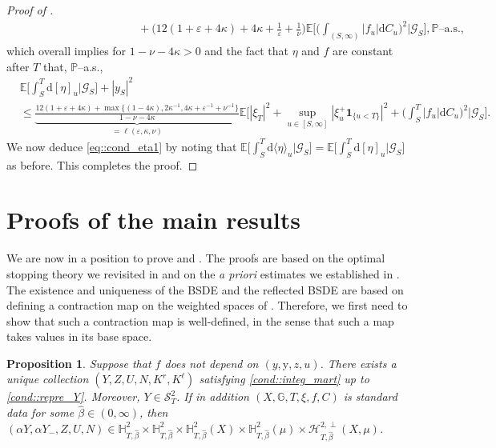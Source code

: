 \documentclass[10pt]{article} %
\newtheorem{proposition}[theorem]{Proposition}
\newcommand\cG{\mathcal G}
\newcommand\cH{\mathcal H}
\newcommand\cS{\mathcal S}
\def \E{\mathbb{E}}
\def \G{\mathbb{G}}
\def \H{\mathbb{H}}
\def \P{\mathbb{P}}
\def\Gc{\mathcal{G}}
\def\eps{\varepsilon}
\def\d{\mathrm{d}}
\begin{document}
\begin{proof}[Proof of ]
\begin{align*}
    &\hspace{4cm}\quad + \bigg(12(1+\varepsilon+4\kappa) + 4\kappa + \frac{1}{\varepsilon} + \frac{1}{\nu}\bigg)\E\bigg[\bigg(\int_{(S,\infty)} | f_u| \d C_u\bigg)^2\bigg|\Gc_S\bigg], \text{$\P$--a.s.},
\end{align*}
which overall implies for $1-\nu-4\kappa > 0$ and the fact that $\eta$ and $f$ are constant after $T$ that, $\P$--a.s.,
\begin{align*}
 &\E\bigg[ \int_S^T \d[\eta]_u \bigg| \cG_S \bigg] + |y_S|^2 \\
 &\leq \underbrace{\frac{12(1+\varepsilon+4\kappa) + \max\{(1-4\kappa),2\kappa^{-1},4\kappa+\varepsilon^{-1}+\nu^{-1}\}}{1-\nu-4\kappa}}_{=\ell(\eps,\kappa,\nu)}\E\bigg[ |\xi_T|^2 + \sup_{u \in [S,\infty]} |\xi^+_u\mathbf{1}_{\{u<T\}}|^2 +\bigg(\int_S^T | f_u| \d C_u\bigg)^2\bigg|\Gc_S \bigg].
\end{align*}
We now deduce \eqref{eq::cond_eta1} by noting that $\E\big[ \int_S^T \d\langle\eta\rangle_u \big| \cG_S \big] =  \E\big[ \int_S^T \d[\eta]_u \big| \cG_S \big]$ as before. This completes the proof.
\end{proof}




\section{Proofs of the main results}\label{sec::existence_rbsde}

We are now in a position to prove  and . The proofs are based on the optimal stopping theory we revisited in  and on the \emph{a priori} estimates we established in . The existence and uniqueness of the BSDE and the reflected BSDE are based on defining a contraction map on the weighted spaces of . Therefore, we first need to show that such a contraction map is well-defined, in the sense that such a map takes values in its base space.

\begin{proposition}\label{lem::exist_simple_gen}
	 Suppose that $f$ does not depend on $(y,\mathrm{y},z,u)$. There exists a unique collection $(Y,Z,U,N,K^r,K^\ell)$ satisfying \ref{cond::integ_mart} up to \ref{cond::repre_Y}. Moreover, $Y \in \cS^2_T$.
	If in addition $(X,\G,T,\xi,f,C)$ is standard data for some $\hat\beta \in (0,\infty)$, then $(\alpha Y,\alpha Y_-,Z,U,N) \in \H^2_{T,\hat\beta} \times \H^2_{T,\hat\beta} \times \H^2_{T,\hat\beta}(X) \times \H^2_{T,\hat\beta}(\mu) \times \cH^{2,\perp}_{T,\hat\beta}(X,\mu)$.
\end{proposition}
\end{document}
